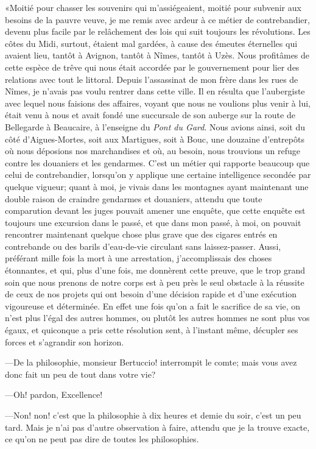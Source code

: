 «Moitié pour chasser les souvenirs qui m'assiégeaient, moitié pour subvenir aux besoins de la pauvre veuve, je me remis avec ardeur à ce métier de contrebandier, devenu plus facile par le relâchement des lois qui suit toujours les révolutions. Les côtes du Midi, surtout, étaient mal gardées, à cause des émeutes éternelles qui avaient lieu, tantôt à Avignon, tantôt à Nîmes, tantôt à Uzès. Nous profitâmes de cette espèce de trêve qui nous était accordée par le gouvernement pour lier des relations avec tout le littoral. Depuis l'assassinat de mon frère dans les rues de Nîmes, je n'avais pas voulu rentrer dans cette ville. Il en résulta que l'aubergiste avec lequel nous faisions des affaires, voyant que nous ne voulions plus venir à lui, était venu à nous et avait fondé une succursale de son auberge sur la route de Bellegarde à Beaucaire, à l'enseigne du \textit{Pont du Gard}. Nous avions ainsi, soit du côté d'Aigues-Mortes, soit aux Martigues, soit à Bouc, une douzaine d'entrepôts où nous déposions nos marchandises et où, au besoin, nous trouvions un refuge contre les douaniers et les gendarmes. C'est un métier qui rapporte beaucoup que celui de contrebandier, lorsqu'on y applique une certaine intelligence secondée par quelque vigueur; quant à moi, je vivais dans les montagnes ayant maintenant une double raison de craindre gendarmes et douaniers, attendu que toute comparution devant les juges pouvait amener une enquête, que cette enquête est toujours une excursion dans le passé, et que dans mon passé, à moi, on pouvait rencontrer maintenant quelque chose plus grave que des cigares entrés en contrebande ou des barils d'eau-de-vie circulant sans laissez-passer. Aussi, préférant mille fois la mort à une arrestation, j'accomplissais des choses étonnantes, et qui, plus d'une fois, me donnèrent cette preuve, que le trop grand soin que nous prenons de notre corps est à peu près le seul obstacle à la réussite de ceux de nos projets qui ont besoin d'une décision rapide et d'une exécution vigoureuse et déterminée. En effet une fois qu'on a fait le sacrifice de sa vie, on n'est plus l'égal des autres hommes, ou plutôt les autres hommes ne sont plus vos égaux, et quiconque a pris cette résolution sent, à l'instant même, décupler ses forces et s'agrandir son horizon. 

—De la philosophie, monsieur Bertuccio! interrompit le comte; mais vous avez donc fait un peu de tout dans votre vie? 

—Oh! pardon, Excellence!  

—Non! non! c'est que la philosophie à dix heures et demie du soir, c'est un peu tard. Mais je n'ai pas d'autre observation à faire, attendu que je la trouve exacte, ce qu'on ne peut pas dire de toutes les philosophies. 

